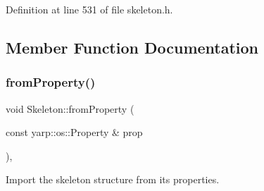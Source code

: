 Definition at line 531 of file skeleton.\+h.



\subsection{Member Function Documentation}
\mbox{\label{classassistive__rehab_1_1Skeleton_ac844f66503de87859833056dc33a835b}} 
\subsubsection{\texorpdfstring{fromProperty()}{fromProperty()}}
{\footnotesize\ttfamily void Skeleton\+::from\+Property (\begin{DoxyParamCaption}\item[{const yarp\+::os\+::\+Property \&}]{prop }\end{DoxyParamCaption})\hspace{0.3cm}{\ttfamily [virtual]}, {\ttfamily [inherited]}}



Import the skeleton structure from its properties. 


